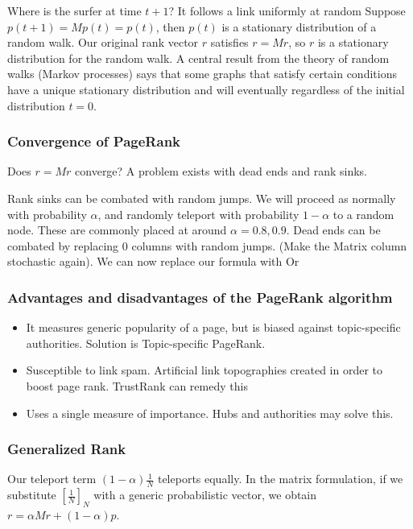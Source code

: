         Where is the surfer at time $t+1$? It follows a link uniformly at random 
        Suppose $p(t+1) = Mp(t) = p(t)$, then $p(t)$ is a stationary distribution of a random walk. Our original rank vector $r$ satisfies $r = Mr$, so $r$ is a stationary distribution for the random walk. A central result from the theory of random walks (Markov processes) says that some graphs that satisfy certain conditions have a unique stationary distribution and will eventually regardless of the initial distribution $t = 0$. 
        
\subsubsection{Convergence of PageRank}
    Does $r = Mr$ converge? A problem exists with dead ends and rank sinks. 
    
    Rank sinks can be combated with random jumps. We will proceed as normally with probability $\alpha$, and randomly teleport with probability $1 - \alpha$ to a random node. These are commonly placed at around $\alpha = 0.8, 0.9$. Dead ends can be combated by replacing $0$ columns with random jumps. (Make the Matrix column stochastic again). We can now replace our formula with 
    Or 
    
\subsubsection{Advantages and disadvantages of the PageRank algorithm}
    \begin{itemize}
        \item It measures generic popularity of a page, but is biased against topic-specific authorities. Solution is Topic-specific PageRank.
        \item Susceptible to link spam. Artificial link topographies created in order to boost page rank. TrustRank can remedy this
        \item Uses a single measure of importance. Hubs and authorities may solve this.
    \end{itemize}
    
\subsubsection{Generalized Rank}
    Our teleport term $(1 - \alpha)\frac{1}{N}$ teleports equally. In the matrix formulation, if we substitute $[\frac{1}{N}]_N$ with a generic probabilistic vector, we obtain $r = \alpha Mr + (1 - \alpha)p$.
    
